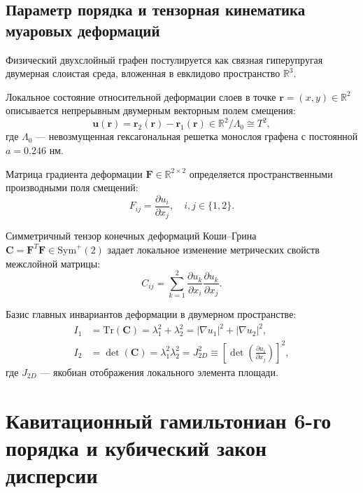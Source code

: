 \documentclass[12pt,a4paper]{article}
\begin{document}
	\subsection{Параметр порядка и тензорная кинематика муаровых деформаций}
	Физический двухслойный графен постулируется как связная гиперупругая двумерная слоистая среда, вложенная в евклидово пространство $\mathbb{R}^3$. 
	
	Локальное состояние относительной деформации слоев в точке $\mathbf{r} = (x, y) \in \mathbb{R}^2$ описывается непрерывным двумерным векторным полем смещения:
	\begin{equation}
		\mathbf{u}(\mathbf{r}) = \mathbf{r}_2(\mathbf{r}) - \mathbf{r}_1(\mathbf{r}) \in \mathbb{R}^2 / \Lambda_0 \cong T^2,
	\end{equation}
	где $\Lambda_0$ — невозмущенная гексагональная решетка монослоя графена с постоянной $a = 0.246\text{ нм}$.
	
	Матрица градиента деформации $\mathbf{F} \in \mathbb{R}^{2 \times 2}$ определяется пространственными производными поля смещений:
	\begin{equation}
		F_{ij} = \frac{\partial u_i}{\partial x_j}, \quad i, j \in \{1, 2\}.
	\end{equation}
	
	Симметричный тензор конечных деформаций Коши--Грина $\mathbf{C} = \mathbf{F}^T \mathbf{F} \in \mathrm{Sym}^+(2)$ задает локальное изменение метрических свойств межслойной матрицы:
	\begin{equation}
		C_{ij} = \sum_{k=1}^2 \frac{\partial u_k}{\partial x_i} \frac{\partial u_k}{\partial x_j}.
	\end{equation}
	
	Базис главных инвариантов деформации в двумерном пространстве:
	\begin{align}
		I_1 &= \mathrm{Tr}(\mathbf{C}) = \lambda_1^2 + \lambda_2^2 = |\nabla u_1|^2 + |\nabla u_2|^2, \\
		I_2 &= \det(\mathbf{C}) = \lambda_1^2 \lambda_2^2 = J_{2D}^2 \equiv \left[ \det\left(\frac{\partial u_i}{\partial x_j}\right) \right]^2,
	\end{align}
	где $J_{2D}$ — якобиан отображения локального элемента площади.
	
	\section{Кавитационный гамильтониан 6-го порядка и кубический закон дисперсии}
	
\end{document}
